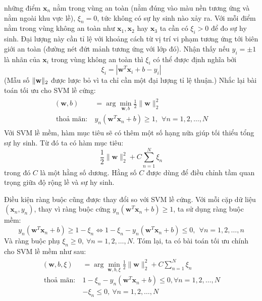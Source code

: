 những điểm $\mathbf{x}_n$ nằm trong {vùng an toàn} (nằm đúng vào màu nền
tương ứng và nằm ngoài khu vực lề), $\xi_n = 0$, tức không có sự
{hy sinh} nào xảy ra. Với mỗi điểm nằm trong {vùng không
an toàn} như $\mathbf{x}_1,
\mathbf{x}_2$ hay $\mathbf{x}_3$ ta cần có $\xi_i > 0$ để đo sự hy sinh. Đại lượng này cần tỉ lệ với khoảng cách từ vị trí vi phạm tương ứng tới
biên giới an toàn (đường nét đứt mảnh tương ứng với lớp đó). Nhận thấy nếu $y_i= \pm 1$ là {nhãn} của
$\mathbf{x}_i$ trong {vùng không an toàn} thì $\xi_i$ có thể được định
nghĩa bởi
\begin{equation}
\xi_i = |\mathbf{w}^T\mathbf{x}_i + b - y_i|
\end{equation}
(Mẫu số $\|\mathbf{w}\|_2$ được lược bỏ vì ta chỉ cần một đại lượng tỉ lệ thuận.)
Nhắc lại bài toán tối ưu cho SVM lề cứng:
\begin{eqnarray}
\label{eqn:20_1}
\begin{aligned}
(\mathbf{w}, b) &= \arg \min_{\mathbf{w}, b} \frac{1}{2}{\|\mathbf{w}\|_2^2}   \\\
\text{thoả mãn:}~ & y_n(\mathbf{w}^T\mathbf{x}_n + b) \geq 1, ~~\forall n = 1, 2, \dots, N
\end{aligned}
\end{eqnarray}
Với SVM lề mềm, hàm mục tiêu sẽ có thêm một số hạng nữa giúp tối
thiểu {tổng sự hy sinh}. Từ đó ta có hàm mục tiêu:
\begin{equation}
\frac{1}{2}{\|\mathbf{w}\|_2^2} + C \sum_{n=1}^N \xi_n
\end{equation}
trong đó $C$ là một hằng số dương. Hằng số $C$ được dùng để điều chỉnh tầm quan trọng giữa độ rộng lề và
sự hy sinh.

Điều kiện ràng buộc cũng được thay đổi so với SVM lề cứng. Với mỗi cặp dữ liệu $(\mathbf{x}_n,
y_n)$, thay vì ràng buộc {cứng} $y_n(\mathbf{w}^T\mathbf{x}_n + b) \geq
1$, ta sử dụng ràng buộc {mềm}:
\begin{equation*}
y_n(\mathbf{w}^T\mathbf{x}_n + b) \geq 1 - \xi_n \Leftrightarrow 1 - \xi_n - y_n(\mathbf{w}^T\mathbf{x}_n + b) \leq 0, ~~ \forall n = 1, 2, \dots, n
\end{equation*}
Và ràng buộc phụ $\xi_n \geq 0, ~\forall n = 1, 2, \dots, N$.
Tóm lại, ta có bài toán tối ưu chính cho SVM lề mềm
như sau:
\begin{eqnarray}
\label{eqn:20_2}
\begin{aligned}
(\mathbf{w}, b, \xi) &= \arg \min_{\mathbf{w}, b, \xi} \frac{1}{2}{\|\mathbf{w}\|_2^2} + C \sum_{n=1}^N \xi_n  \\\
\text{thoả mãn:}~ & 1 - \xi_n - y_n(\mathbf{w}^T\mathbf{x}_n + b) \leq 0, \forall n = 1, 2, \dots, N  \\\
& -\xi_n \leq 0,  ~\forall n = 1, 2, \dots, N
\end{aligned}
\end{eqnarray}


